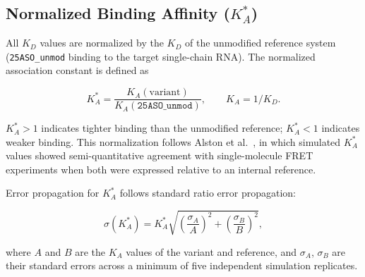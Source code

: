 \subsection{Normalized Binding Affinity ($K_A^*$)}
\label{sec:KA_star}

All $K_D$ values are normalized by the $K_D$ of the unmodified
reference system (\texttt{25ASO\_unmod} binding to the target
single-chain RNA).
The normalized association constant is defined as

\begin{equation}
  K_A^* = \frac{K_A(\text{variant})}{K_A(\texttt{25ASO\_unmod})},
  \qquad K_A = 1/K_D.
  \label{eq:KA_star}
\end{equation}

$K_A^* > 1$ indicates tighter binding than the unmodified reference;
$K_A^* < 1$ indicates weaker binding.
This normalization follows Alston et al.~\cite{Alston2023}, in which
simulated $K_A^*$ values showed semi-quantitative agreement with
single-molecule FRET experiments when both were expressed relative to
an internal reference.

Error propagation for $K_A^*$ follows standard ratio error propagation:

\begin{equation}
  \sigma(K_A^*) = K_A^* \sqrt{\left(\frac{\sigma_A}{A}\right)^2
    + \left(\frac{\sigma_B}{B}\right)^2},
  \label{eq:error_prop}
\end{equation}

where $A$ and $B$ are the $K_A$ values of the variant and reference,
and $\sigma_A$, $\sigma_B$ are their standard errors across a minimum
of five independent simulation replicates.

